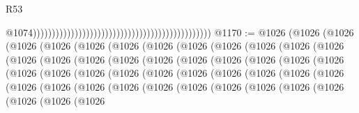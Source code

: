 \begin{lexlean}{R53}
\begin{coremodule}
                                                                                                  @1074)))))))))))))))))))))))))))))))))))))))))))))))
@1170 := @1026
    (@1026
      (@1026
        (@1026
          (@1026
            (@1026
              (@1026
                (@1026
                  (@1026
                    (@1026
                      (@1026
                        (@1026
                          (@1026
                            (@1026
                              (@1026
                                (@1026
                                  (@1026
                                    (@1026
                                      (@1026
                                        (@1026
                                          (@1026
                                            (@1026
                                              (@1026
                                                (@1026
                                                  (@1026
                                                    (@1026
                                                      (@1026
                                                        (@1026
                                                          (@1026
                                                            (@1026
                                                              (@1026
                                                                (@1026
                                                                  (@1026
                                                                    (@1026
                                                                      (@1026
                                                                        (@1026
                                                                          (@1026
                                                                            (@1026
                                                                              (@1026
                                                                                (@1026
                                                                                  (@1026
                                                                                    (@1026
                                                                                      (@1026
                                                                                        (@1026
                                                                                          (@1026
                                                                                            (@1026

\end{coremodule}
\end{lexlean}
